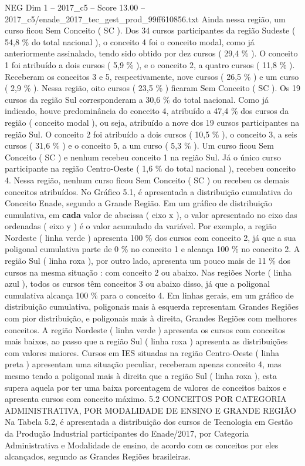 \begin{textsample}{NEG Dim 1 – 2017\_c5 – Score 13.00 – 2017\_c5/enade\_2017\_tec\_gest\_prod\_99ff610856.txt}
Ainda nessa região, um curso ficou Sem Conceito ( SC ).
Dos 34 cursos participantes da região Sudeste ( 54,8 \% do total nacional ), o conceito 4 foi o conceito modal, como já anteriormente assinalado, tendo sido obtido por dez cursos ( 29,4 \% ).
O conceito 1 foi atribuído a dois cursos ( 5,9 \% ), e o conceito 2, a quatro cursos ( 11,8 \% ).
Receberam os conceitos 3 e 5, respectivamente, nove cursos ( 26,5 \% ) e um curso ( 2,9 \% ).
Nessa região, oito cursos ( 23,5 \% ) ficaram Sem Conceito ( SC ).
Os 19 cursos da região Sul corresponderam a 30,6 \% do total nacional.
Como já indicado, houve predominância do conceito 4, atribuído a 47,4 \% dos cursos da região ( conceito modal ), ou seja, atribuído a nove dos 19 cursos participantes na região Sul.
O conceito 2 foi atribuído a dois cursos ( 10,5 \% ), o conceito 3, a seis cursos ( 31,6 \% ) e o conceito 5, a um curso ( 5,3 \% ).
Um curso ficou Sem Conceito ( SC ) e nenhum recebeu conceito 1 na região Sul.
Já o único curso participante na região Centro-Oeste ( 1,6 \% do total nacional ), recebeu conceito 4.
Nessa região, nenhum curso ficou Sem Conceito ( SC ) ou recebeu os demais conceitos atribuídos.
No Gráfico 5.1, é apresentada a distribuição cumulativa do Conceito Enade, segundo a Grande Região.
Em um gráfico de distribuição cumulativa, em \textbf{cada} valor de abscissa ( eixo x ), o valor apresentado no eixo das ordenadas ( eixo y ) é o valor acumulado da variável.
Por exemplo, a região Nordeste ( linha verde ) apresenta 100 \% dos cursos com conceito 2, já que a sua poligonal cumulativa parte de 0 \% no conceito 1 e alcança 100 \% no conceito 2.
A região Sul ( linha roxa ), por outro lado, apresenta um pouco mais de 11 \% dos cursos na mesma situação : com conceito 2 ou abaixo.
Nas regiões Norte ( linha azul ), todos os cursos têm conceitos 3 ou abaixo disso, já que a poligonal cumulativa alcança 100 \% para o conceito 4.
Em linhas gerais, em um gráfico de distribuição cumulativa, poligonais mais à esquerda representam Grandes Regiões com pior distribuição, e poligonais mais à direita, Grandes Regiões com melhores conceitos.
A região Nordeste ( linha verde ) apresenta os cursos com conceitos mais baixos, ao passo que a região Sul ( linha roxa ) apresenta as distribuições com valores maiores.
Cursos em IES situadas na região Centro-Oeste ( linha preta ) apresentam uma situação peculiar, receberam apenas conceito 4, mas mesmo tendo a poligonal mais à direita que a região Sul ( linha roxa ), esta supera aquela por ter uma baixa porcentagem de valores de conceitos baixos e apresenta cursos com conceito máximo. 5.2 CONCEITOS POR CATEGORIA ADMINISTRATIVA, POR MODALIDADE DE ENSINO E GRANDE REGIÃO Na Tabela 5.2, é apresentada a distribuição dos cursos de Tecnologia em Gestão da Produção Industrial participantes do Enade/2017, por Categoria Administrativa e Modalidade de ensino, de acordo com os conceitos por eles alcançados, segundo as Grandes Regiões brasileiras.

\end{textsample}
